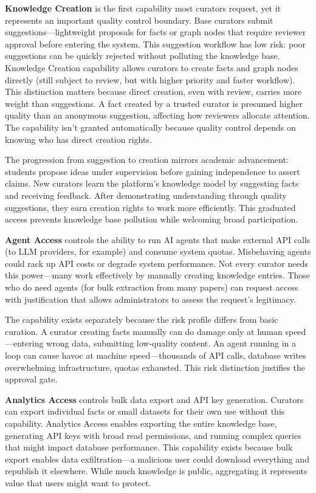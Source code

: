\documentclass[12pt,a4paper]{article}
\begin{document}
\textbf{Knowledge Creation} is the first capability most curators request, yet it represents an important quality control boundary. Base curators submit suggestions—lightweight proposals for facts or graph nodes that require reviewer approval before entering the system. This suggestion workflow has low risk: poor suggestions can be quickly rejected without polluting the knowledge base. Knowledge Creation capability allows curators to create facts and graph nodes directly (still subject to review, but with higher priority and faster workflow). This distinction matters because direct creation, even with review, carries more weight than suggestions. A fact created by a trusted curator is presumed higher quality than an anonymous suggestion, affecting how reviewers allocate attention. The capability isn't granted automatically because quality control depends on knowing who has direct creation rights.

The progression from suggestion to creation mirrors academic advancement: students propose ideas under supervision before gaining independence to assert claims. New curators learn the platform's knowledge model by suggesting facts and receiving feedback. After demonstrating understanding through quality suggestions, they earn creation rights to work more efficiently. This graduated access prevents knowledge base pollution while welcoming broad participation.

\textbf{Agent Access} controls the ability to run AI agents that make external API calls (to LLM providers, for example) and consume system quotas. Misbehaving agents could rack up API costs or degrade system performance. Not every curator needs this power—many work effectively by manually creating knowledge entries. Those who do need agents (for bulk extraction from many papers) can request access with justification that allows administrators to assess the request's legitimacy.

The capability exists separately because the risk profile differs from basic curation. A curator creating facts manually can do damage only at human speed—entering wrong data, submitting low-quality content. An agent running in a loop can cause havoc at machine speed—thousands of API calls, database writes overwhelming infrastructure, quotas exhausted. This risk distinction justifies the approval gate.

\textbf{Analytics Access} controls bulk data export and API key generation. Curators can export individual facts or small datasets for their own use without this capability. Analytics Access enables exporting the entire knowledge base, generating API keys with broad read permissions, and running complex queries that might impact database performance. This capability exists because bulk export enables data exfiltration—a malicious user could download everything and republish it elsewhere. While much knowledge is public, aggregating it represents value that users might want to protect.
\end{document}
